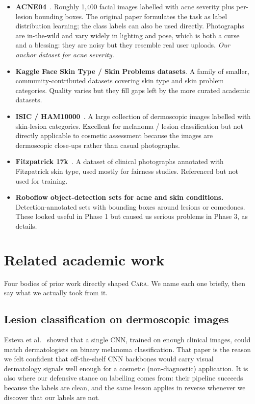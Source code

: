 \documentclass[11pt,a4paper,oneside]{report}
\newcommand{\cara}{\textsc{Cara}\xspace}
\begin{document}
\begin{itemize}
    \item \textbf{ACNE04}~\cite{wu2019acne04}. Roughly 1{,}400 facial
        images labelled with acne severity plus per-lesion bounding
        boxes. The original paper formulates the task as label
        distribution learning; the class labels can also be used
        directly. Photographs are in-the-wild and vary widely in
        lighting and pose, which is both a curse and a blessing: they
        are noisy but they resemble real user uploads. \emph{Our
        anchor dataset for acne severity.}
    \item \textbf{Kaggle Face Skin Type / Skin Problems datasets}. A
        family of smaller, community-contributed datasets covering
        skin type and skin problem categories. Quality varies but
        they fill gaps left by the more curated academic datasets.
    \item \textbf{ISIC / HAM10000}~\cite{tschandl2018ham10000}. A
        large collection of dermoscopic images labelled with
        skin-lesion categories. Excellent for melanoma / lesion
        classification but not directly applicable to cosmetic
        assessment because the images are dermoscopic close-ups
        rather than casual photographs.
    \item \textbf{Fitzpatrick 17k}~\cite{groh2021fitzpatrick}. A
        dataset of clinical photographs annotated with Fitzpatrick
        skin type, used mostly for fairness studies. Referenced but
        not used for training.
    \item \textbf{Roboflow object-detection sets for acne and skin
        conditions.} Detection-annotated sets with bounding boxes
        around lesions or comedones. These looked useful in Phase 1
        but caused us serious problems in Phase 3, as
         details.
\end{itemize}

\section{Related academic work}

Four bodies of prior work directly shaped \cara. We name each one
briefly, then say what we actually took from it.

\subsection{Lesion classification on dermoscopic images}
Esteva et al.~\cite{esteva2017dermatologist} showed that a single
CNN, trained on enough clinical images, could match dermatologists
on binary melanoma classification. That paper is the reason we felt
confident that off-the-shelf CNN backbones would carry visual
dermatology signals well enough for a cosmetic (non-diagnostic)
application. It is also where our defensive stance on labelling
comes from: their pipeline succeeds because the labels are
clean, and the same lesson applies in reverse whenever we discover
that our labels are not.
\end{document}
